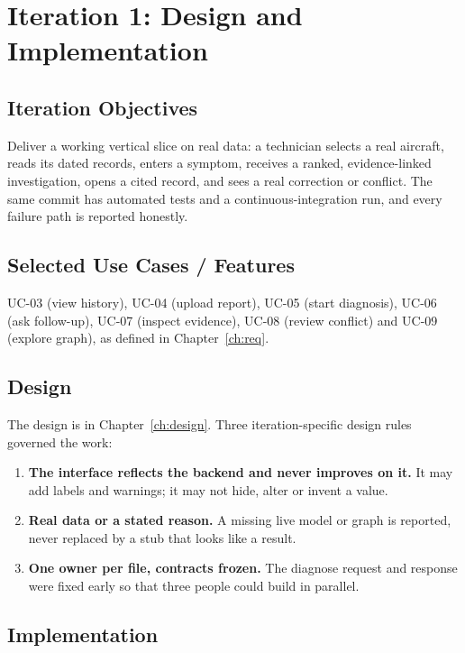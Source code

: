 \chapter{Iteration 1: Design and Implementation}\label{ch:iter1}

\section{Iteration Objectives}
Deliver a working vertical slice on real data: a technician selects a real aircraft, reads its dated records, enters a symptom, receives a ranked, evidence-linked investigation, opens a cited record, and sees a real correction or conflict. The same commit has automated tests and a continuous-integration run, and every failure path is reported honestly.

\section{Selected Use Cases / Features}
UC-03 (view history), UC-04 (upload report), UC-05 (start diagnosis), UC-06 (ask follow-up), UC-07 (inspect evidence), UC-08 (review conflict) and UC-09 (explore graph), as defined in Chapter~\ref{ch:req}.

\section{Design}
The design is in Chapter~\ref{ch:design}. Three iteration-specific design rules governed the work:
\begin{enumerate}
\item \textbf{The interface reflects the backend and never improves on it.} It may add labels and warnings; it may not hide, alter or invent a value.
\item \textbf{Real data or a stated reason.} A missing live model or graph is reported, never replaced by a stub that looks like a result.
\item \textbf{One owner per file, contracts frozen.} The diagnose request and response were fixed early so that three people could build in parallel.
\end{enumerate}

\section{Implementation}\label{sec:setup}

